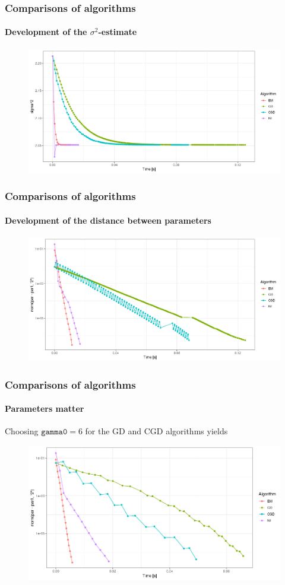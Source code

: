 \documentclass[aspectratio=169]{beamer}
\begin{document}
\begin{frame}
    \frametitle{Comparisons of algorithms}
    \framesubtitle{Development of the $\sigma^{2}$-estimate}
    \begin{figure}
        \centering
        \includegraphics[scale = 0.4]{pictures/NewComp/AllSigmaNu3.png}
    \end{figure}
\end{frame}
\begin{frame}
    \frametitle{Comparisons of algorithms}
    \framesubtitle{Development of the distance between parameters}
    \begin{figure}
        \centering
        \includegraphics[scale = 0.4]{pictures/NewComp/AllNormNu3.png}
    \end{figure}
\end{frame}
\begin{frame}
    \frametitle{Comparisons of algorithms}
    \framesubtitle{Parameters matter}
    Choosing $\texttt{gamma0} = 6$ for the GD and CGD algorithms yields
    \begin{figure}
        \centering
        \includegraphics[scale = 0.4]{pictures/NewComp/ChangedParameters.png}
    \end{figure}
\end{frame}
\end{document}
